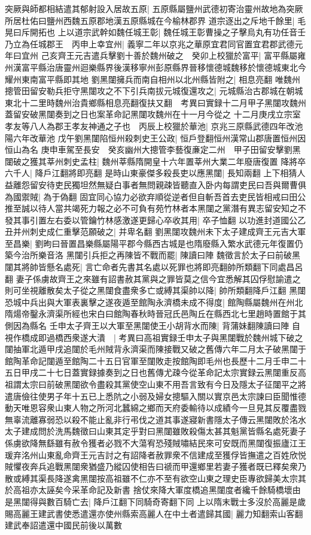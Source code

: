 突厥與師都相結遣其郁射設入居故五原|{
	五原縣屬鹽州武德初寄治靈州故地為突厥所居杜佑曰鹽州西魏五原郡地漢五原縣城在今榆林郡界}
道宗逐出之斥地千餘里|{
	毛晃曰斥開拓也}
上以道宗武幹如魏任城王彰|{
	魏任城王彰曹操之子擊烏丸有功任音壬}
乃立為任城郡王　丙申上幸宜州|{
	義寧二年以京兆之華原宜君同官置宜君郡武德元年曰宜州}
己亥齊王元吉遣兵擊劉十善於魏州破之　癸卯上校獵於富平|{
	富平縣屬雍州漢富平縣治唐靈州迴樂縣界後漢移寧州彭原縣界晉移懷德城魏移於懷德城東北今耀州東南富平縣即其地}
劉黑闥擁兵而南自相州以北州縣皆附之|{
	相息亮翻}
唯魏州摠管田留安勒兵拒守黑闥攻之不下引兵南拔元城復還攻之|{
	元城縣治古郡城在朝城東北十二里時魏州治貴鄉縣相息亮翻復扶又翻　考異曰實録十二月甲子黑闥攻魏州蓋留安破黑闥奏到之日也案革命記黑闥攻魏州在十一月今從之}
十二月庚戌立宗室孝友等八人為郡王孝友神通之子也　丙辰上校獵於華池|{
	京兆三原縣武德四年改池陽六年改華池}
戊午劉黑闥陷恒州殺刺史王公政|{
	恒戶登翻恒州漢常山郡唐置恒州因恒山為名}
庚申車駕至長安　癸亥幽州大摠管李藝復亷定二州　甲子田留安擊劉黑闥破之獲其莘州刺史孟柱|{
	魏州莘縣隋開皇十六年置莘州大業二年廢唐復置}
降將卒六千人|{
	降戶江翻將即亮翻}
是時山東豪傑多殺長吏以應黑闥|{
	長知兩翻}
上下相猜人益離怨留安待吏民獨坦然無疑白事者無問親疎皆聽直入卧内每謂吏民曰吾與爾曹俱為國禦賊|{
	為于偽翻}
固宜同心協力必欲弃順從逆者但自斬吾首去吏民皆相戒曰田公推至誠以待人當共竭死力報之必不可負有苑竹林者本黑闥之黨潛有異志留安知之不發其事引置左右委以管鑰竹林感激遂更歸心卒收其用|{
	卒子恤翻}
以功進封道國公乙丑并州刺史成仁重擊范願破之|{
	并卑名翻}
劉黑闥攻魏州未下太子建成齊王元吉大軍至昌樂|{
	劉昫曰晉置昌樂縣屬陽平郡今縣西古城是也隋廢縣入繁水武德元年復置仍築今治所樂音洛}
黑闥引兵拒之再陳皆不戰而罷|{
	陳讀曰陣}
魏徵言於太子曰前破黑闥其將帥皆懸名處死|{
	言亡命者先書其名處以死罪也將即亮翻帥所類翻下同處昌呂翻}
妻子係虜故齊王之來雖有詔書赦其黨與之罪皆莫之信今宜悉解其囚俘慰諭遣之則可坐視離散矣太子從之黑闥食盡衆多亡或縛其渠帥以降|{
	帥所類翻降戶江翻}
黑闥恐城中兵出與大軍表裏擊之遂夜遁至館陶永濟橋未成不得度|{
	館陶縣屬魏州在州北隋煬帝鑿永濟渠所經也宋白曰館陶春秋時晉冠氏邑陶丘在縣西北七里趙時置館于其側因為縣名}
壬申太子齊王以大軍至黑闥使王小胡背水而陳|{
	背蒲妹翻陳讀曰陣}
自視作橋成即過橋西衆遂大潰　|{
	考異曰高祖實録壬申太子與黑闥戰於魏州城下破之闥抽軍北遁甲戌追闥於毛州賊背永濟渠而陳接戰又破之舊傳六年二月太子破黑闥于館陶革命記闥遁至館陶二十五日官軍至闥敗走按館陶即毛州也長歷十二月壬申二十五日甲戌二十七日蓋實録據奏到之日也舊傳尤疎今從革命記太宗實録云黑闥重反高祖謂太宗曰前破黑闥欲令盡殺其黨使空山東不用吾言致有今日及隱太子征闥平之將遣唐儉往使男子年十五已上悉阬之小弱及婦女摠驅入關以實京邑太宗諫曰臣聞惟德動天唯恩容衆山東人物之所河北蠶綿之鄉而天府委輸待以成績今一旦見其反覆盡戮無辜流離寡弱恐以殺不能止亂非行弔伐之道其事遂寢新書隱太子傳云黑闥敗於洺水太子建成問於洗馬魏徵曰山東其定乎對曰黑闥雖敗殺傷太甚其魁黨皆縣名處死妻子係虜欲降無繇雖有赦令獲者必戮不大蕩宥恐殘賊嘯結民來可安既而黑闥復振廬江王瑗弃洺州山東亂命齊王元吉討之有詔降者赦罪衆不信建成至獲俘皆撫遣之百姓欣悦賊懼夜奔兵追戰黑闥衆猶盛乃縱囚使相告曰禠而甲還鄉里若妻子獲者既已釋矣衆乃散或縛其渠長降遂禽黑闥按高祖雖不仁亦不至有欲空山東之理史臣專欲歸美太宗其於高祖亦太誣矣今采革命記及新書}
捨仗來降大軍度橋追黑闥度者纔千餘騎橋壞由是黑闥得與數百騎亡去|{
	降戶江翻下同騎奇寄翻下同}
上以隋末戰士多沒於高麗是歲賜高麗王建武書使悉遣還亦使州縣索高麗人在中土者遣歸其國|{
	麗力知翻索山客翻}
建武奉詔遣還中國民前後以萬數

